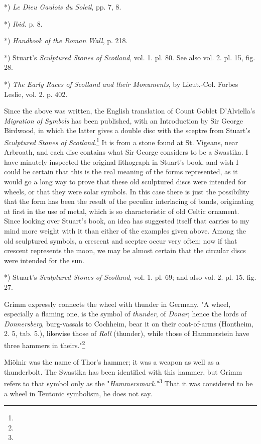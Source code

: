 \documentclass[a4paper, 11pt, oneside, polutonikogreek, english]{article}
\begin{document}
*) \emph{Le Dieu Gaulois du Soleil}, pp. 7, 8.

*) \emph{Ibid.} p. 8.

*) \emph{Handbook of the Roman Wall}, p. 218.

*) Stuart's \emph{Sculptured Stones of Scotland}, vol. 1. pl. 80. See also vol. 2. pl. 15, fig. 28.

*) \emph{The Early Races of Scotland and their Monuments}, by Lieut.-Col. Forbes Leslie, vol. 2. p. 402.

Since the above was written, the English translation of Count Goblet D'Alviella's \emph{Migration of Symbols} has been published, with an Introduction by Sir George Birdwood, in which the latter gives a double disc with the sceptre from Stuart's \emph{Sculptured Stones of Scotland}.\footnote{} It is from a stone found at St. Vigeans, near Arbroath, and each disc contains what Sir George considers to be a Swastika. I have minutely inspected the original lithograph in Stuart's book, and wish I could be certain that this is the real meaning of the forms represented, as it would go a long way to prove that these old sculptured discs were intended for wheels, or that they were solar symbols. In this case there is just the possibility that the form has been the result of the peculiar interlacing of bands, originating at first in the use of metal, which is so characteristic of old Celtic ornament. Since looking over Stuart's book, an idea has suggested itself that carries to my mind more weight with it than either of the examples given above. Among the old sculptured symbols, a crescent and sceptre occur very often; now if that crescent represents the moon, we may be almost certain that the circular discs were intended for the sun.

*) Stuart's \emph{Sculptured Stones of Scotland}, vol. 1. pl. 69; and also vol. 2. pl. 15. fig. 27.

Grimm expressly connects the wheel with thunder in Germany. "A wheel, especially a flaming one, is the symbol of \emph{thunder}, of \emph{Donar}; hence the lords of \emph{Donnersberg}, burg-vassals to Cochheim, bear it on their coat-of-arms (Hontheim, 2. 5, tab. 5.), likewise those of \emph{Roll} (thunder), while those of Hammerstein have three hammers in theirs."\footnote{}

Miölnir was the name of Thor's hammer; it was a weapon as well as a thunderbolt. The Swastika has been identified with this hammer, but Grimm refers to that symbol only as the "\emph{Hammersmark}."\footnote{} That it was considered to be a wheel in Teutonic symbolism, he does not say.
\end{document}
